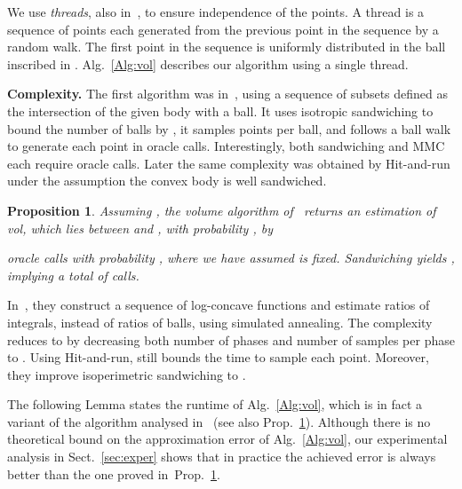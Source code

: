 \documentclass[11pt,a4paper]{article}
\newtheorem{proposition}[theorem]{\noindent Proposition}
\def\vol{\mbox{vol}}
\def\vol{\mbox{vol}}
\begin{document}
We use {\it threads}, also in~\cite{LovaszD12}, to ensure independence
of the points. A thread is a sequence of points each generated from
the previous point in the sequence by a random walk.
The first point in the sequence is uniformly distributed in the ball
inscribed in .
Alg.~\ref{Alg:vol} describes our algorithm using a single thread. 

\textbf{Complexity.}
The first  algorithm was in~\cite{KannanLS97}, using
a sequence of subsets defined as the intersection of
the given body with a ball. 
It uses isotropic sandwiching to bound the number of balls by ,
it samples  points per ball, 
and follows a ball walk to generate each point in  oracle calls. 
Interestingly, both sandwiching and MMC each require  oracle calls.
Later the same complexity was obtained by
Hit-and-run under the assumption the convex body is well sandwiched.

\begin{proposition}{\em\cite{KannanLS97}}\label{prop:volume}
Assuming , the volume algorithm of~\cite{KannanLS97} 
returns an estimation of \vol, which lies between 
 and ,
with probability , by 
 
oracle calls with probability , where we have assumed
 is fixed.
Sandwiching yields
, implying a total of  calls.
\end{proposition}

In~\cite{LovaszVemp06vol}, they construct 
a sequence of log-concave functions and estimate ratios of integrals, instead of ratios of balls, using simulated annealing.
The complexity reduces to 
by decreasing both number of phases and number of samples per phase to . Using Hit-and-run,  still bounds the time to sample each point.
Moreover, they improve isoperimetric sandwiching to .
 
The following Lemma states the runtime of Alg.~\ref{Alg:vol}, which is in fact a variant of the algorithm analysed in~\cite{KannanLS97} (see also Prop.~\ref{prop:volume}). Although there is no theoretical bound on the approximation error of Alg.~\ref{Alg:vol}, our experimental analysis in Sect.~\ref{sec:exper} shows that in practice the achieved error is always  better than the one proved in~Prop.~\ref{prop:volume}.
\end{document}

